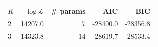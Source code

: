 \begin{tabular}{lrrrr}
\toprule
$K$ & $\log\mathcal{L}$ & \# params & AIC & BIC \\
\midrule
2 & 14207.0 & 7 & -28400.0 & -28356.8 \\
3 & 14323.8 & 14 & -28619.7 & -28533.4 \\
\bottomrule
\end{tabular}
